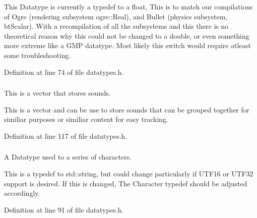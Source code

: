 This Datatype is currently a typedef to a float, This is to match our compilations of Ogre (rendering subsystem ogre::Real), and Bullet (physics subsystem, btScalar). With a recompilation of all the subsystems and this there is no theoretical reason why this could not be changed to a double, or even something more extreme like a GMP datatype. Most likely this switch would require atleast some troubleshooting. 

Definition at line 74 of file datatypes.h.

\hypertarget{namespacephys_ab780c3162da5699fe421f3739ba03fc4}{
\subsubsection[{SoundSet}]{}}
\label{df/dec/namespacephys_ab780c3162da5699fe421f3739ba03fc4}


This is a vector that stores sounds. 

This is a vector and can be use to store sounds that can be grouped together for similiar purposes or similiar content for easy tracking. 

Definition at line 117 of file datatypes.h.

\hypertarget{namespacephys_aa03900411993de7fbfec4789bc1d392e}{
\subsubsection[{String}]{}}
\label{df/dec/namespacephys_aa03900411993de7fbfec4789bc1d392e}


A Datatype used to a series of characters. 

This is a typedef to std::string, but could change particularly if UTF16 or UTF32 support is desired. If this is changed, The Character typedef should be adjusted accordingly. 

Definition at line 91 of file datatypes.h.

\hypertarget{namespacephys_a460f6bc24c8dd347b05e0366ae34f34a}{
\subsubsection[{Whole}]{}}
\label{df/dec/namespacephys_a460f6bc24c8dd347b05e0366ae34f34a}


